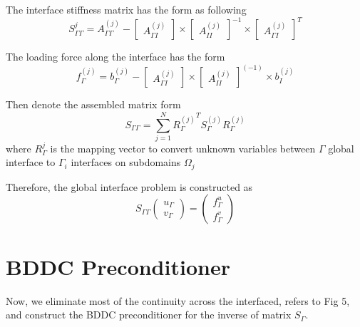 The interface stiffness matrix has the form as following
\begin{equation}
S_{\Gamma \Gamma}^{j} = A_{\Gamma \Gamma}^{(j)} - 
\begin{bmatrix}
A_{\Gamma I}^{(j)}
\end{bmatrix} \times
\begin{bmatrix}
A_{II}^{(j)}
\end{bmatrix}^{-1} \times
\begin{bmatrix}
A_{\Gamma I}^{(j)}
\end{bmatrix}^{T}
\end{equation}

The loading force along the interface has the form
\begin{equation}
f_{\Gamma}^{(j)} = b_{\Gamma}^{(j)} - 
\begin{bmatrix}
A_{\Gamma I}^(j) 
\end{bmatrix} \times
\begin{bmatrix}
A_{II}^{(j)}
\end{bmatrix}^{(-1)} \times
b_{I}^{(j)}
\end{equation}

Then denote the assembled matrix form
\begin{equation}
S_{\Gamma \Gamma} = \sum_{j = 1}^{N} {R_{\Gamma}^{(j)}}^{T} S_{\Gamma}^{(j)}R_{\Gamma}^{(j)}
\end{equation}
where $ R_{\Gamma}^{j} $ is the mapping vector to convert unknown variables between $ \Gamma $ global interface to $ \Gamma_i $ interfaces on subdomains $ \Omega_j $

Therefore, the global interface problem is constructed as 
\begin{equation}
S_{\Gamma \Gamma } \begin{pmatrix}
u_{\Gamma} \\ v_{\Gamma}
\end{pmatrix} = 
\begin{pmatrix}
f_{\Gamma}^{u} \\ f_{\Gamma}^{v}
\end{pmatrix}
\end{equation}

\section{BDDC Preconditioner}

Now, we eliminate most of the continuity across the interfaced, refers to Fig 5, and construct the BDDC preconditioner for the inverse of matrix $ S_{\Gamma} $.

